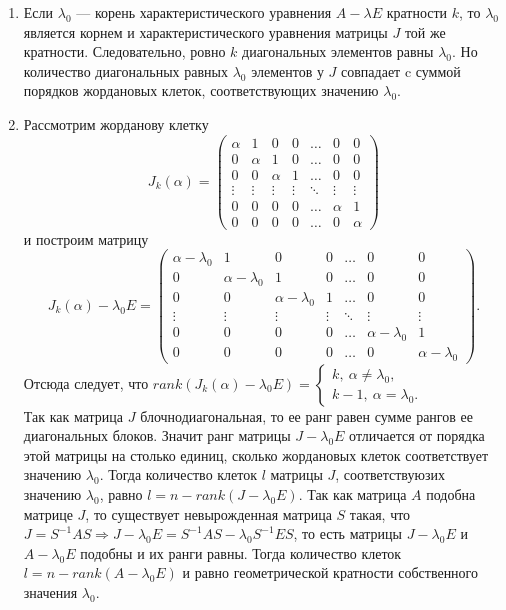 \begin{Proof}
\begin{enumerate}
		\item Если $\lambda_0$ --- корень характеристического уравнения $A-\lambda E$ кратности $k$, то $\lambda_0$ является корнем и характеристического уравнения матрицы $J$ той же кратности. Следовательно, ровно $k$ диагональных элементов равны $\lambda_0$. Но количество диагональных равных $\lambda_0$ элементов у $J$ совпадает c суммой порядков жордановых клеток, соответствующих значению $\lambda_0$.
		\item Рассмотрим жорданову клетку $$J_k(\alpha) = \begin{pmatrix}
			\alpha & 1 & 0 & 0 & \dots & 0 & 0\\
			0 & \alpha & 1 & 0 & \dots & 0 & 0\\
			0 & 0 & \alpha & 1 & \dots & 0 & 0\\
			\vdots & \vdots & \vdots & \vdots & \ddots & \vdots & \vdots \\
			0 & 0 & 0 & 0 &\dots& \alpha & 1\\
			0 & 0 & 0 & 0 &\dots& 0 & \alpha
		\end{pmatrix}$$ и построим матрицу  $$J_k(\alpha) - \lambda_0 E =
		\begin{pmatrix} \alpha - \lambda_0 & 1 & 0 & 0 & \dots & 0 & 0 \\
			0 & \alpha - \lambda_0 & 1 & 0 & \dots & 0 & 0 \\
			0 & 0 & \alpha - \lambda_0 & 1 & \dots & 0 & 0 \\
			\vdots & \vdots & \vdots & \vdots & \ddots & \vdots & \vdots\\
			0 & 0 & 0 & 0 & \dots & \alpha - \lambda_0 & 1 \\
			0 & 0 & 0 & 0 & \dots & 0 & \alpha - \lambda_0
		\end{pmatrix}.$$
		Отсюда следует, что $rank (J_k(\alpha) - \lambda_0 E) = \begin{cases}
			k,\ \alpha \ne \lambda_0,\\
			k - 1,\ \alpha = \lambda_0.
		\end{cases}$\\
		Так как матрица $J$ блочнодиагональная, то ее ранг равен сумме рангов ее диагональных блоков. Значит ранг матрицы $J - \lambda_0 E$ отличается от порядка этой матрицы на столько единиц, сколько жордановых клеток соответствует значению $\lambda_0$. Тогда количество клеток $l$ матрицы $J$, соответствуюзих значению $\lambda_0$, равно $l = n - rank(J-\lambda_0 E)$. Так как матрица $A$ подобна матрице $J$, то существует невырожденная матрица $S$ такая, что $J = S^{-1}AS\Rightarrow J - \lambda_0 E = S^{-1}AS - \lambda_0 S^{-1}ES$, то есть матрицы $J-\lambda_0 E$ и $A-\lambda_0 E$ подобны и их ранги равны. Тогда количество клеток $l = n - rank(A - \lambda_0 E)$ и равно геометрической кратности собственного значения $\lambda_0$.

\end{enumerate}
\end{Proof}
